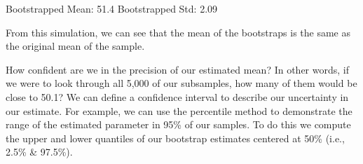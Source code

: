 \documentclass[letterpaper,10pt,english]{sphinxmanual}
\begin{document}
\begin{sphinxVerbatim}[commandchars=\\\{\}]
Bootstrapped Mean: 51.4
Bootstrapped Std: 2.09
\end{sphinxVerbatim}

\noindent{}

From this simulation, we can see that the mean of the bootstraps is the same as the original mean of the sample.

How confident are we in the precision of our estimated mean? In other words, if we were to look through all 5,000 of our subsamples, how many of them would be close to 50.1? We can define a confidence interval to describe our uncertainty in our estimate. For example, we can use the percentile method to demonstrate the range of the estimated parameter in 95\% of our samples. To do this we compute the upper and lower quantiles of our bootstrap estimates centered at 50\% (i.e., 2.5\% \& 97.5\%).
\end{document}
